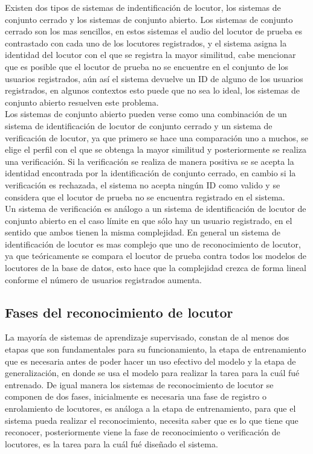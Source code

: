 Existen dos tipos de sistemas de indentificaci\'on de locutor, los sistemas de conjunto cerrado y los sistemas de conjunto abierto. Los sistemas de conjunto cerrado son los mas sencillos, en estos sistemas el audio del locutor de prueba es contrastado con cada uno de los locutores registrados, y el sistema asigna la identidad del locutor con el que se registra la mayor similitud, cabe mencionar que es posible que el locutor de prueba no se encuentre en el conjunto de los usuarios registrados, a\'un as\'i el sistema devuelve un ID de alguno de los usuarios registrados, en algunos contextos esto puede que no sea lo ideal, los sistemas de conjunto abierto resuelven este problema.\\ 

Los sistemas de conjunto abierto pueden verse como una combinaci\'on de un sistema de identificaci\'on de locutor de conjunto cerrado y un sistema de verificaci\'on de locutor, ya que primero se hace una comparaci\'on uno a muchos, se elige el perfil con el que se obtenga la mayor similitud y posteriormente se realiza una verificaci\'on. Si la verificaci\'on se realiza de manera positiva se se acepta la identidad encontrada por la identificaci\'on de conjunto cerrado, en cambio si la verificaci\'on es rechazada, el sistema no acepta ning\'un ID como valido y se considera que el locutor de prueba no se encuentra registrado en el sistema.\\

Un sistema de verificaci\'on es an\'alogo a un sistema de identificaci\'on de locutor de conjunto abierto en el caso l\'imite en que s\'olo hay un usuario registrado, en el sentido que ambos tienen la misma complejidad. En general un sistema de identificaci\'on de locutor es mas complejo que uno de reconocimiento de locutor, ya que te\'oricamente se compara el locutor de prueba contra todos los modelos de locutores de la base de datos, esto hace que la complejidad crezca de forma lineal conforme el n\'umero de usuarios registrados aumenta.\\

\subsection{Fases del reconocimiento de locutor}

La mayor\'ia de sistemas de aprendizaje supervisado, constan de al menos dos etapas que son fundamentales para su funcionamiento, la etapa de entrenamiento que es necesaria antes de poder hacer un uso efectivo del modelo y la etapa de generalizaci\'on, en donde se usa el modelo para realizar la tarea para la cu\'al fu\'e entrenado. De igual manera los sistemas de reconocimiento de locutor se componen de dos fases, inicialmente es necesaria una fase de registro o enrolamiento de locutores, es an\'aloga a la etapa de entrenamiento, para que el sistema pueda realizar el reconocimiento, necesita saber que es lo que tiene que reconocer, posteriormente viene la fase de reconocimiento o verificaci\'on de locutores, es la tarea para la cu\'al fu\'e diseñado el sistema.\\

